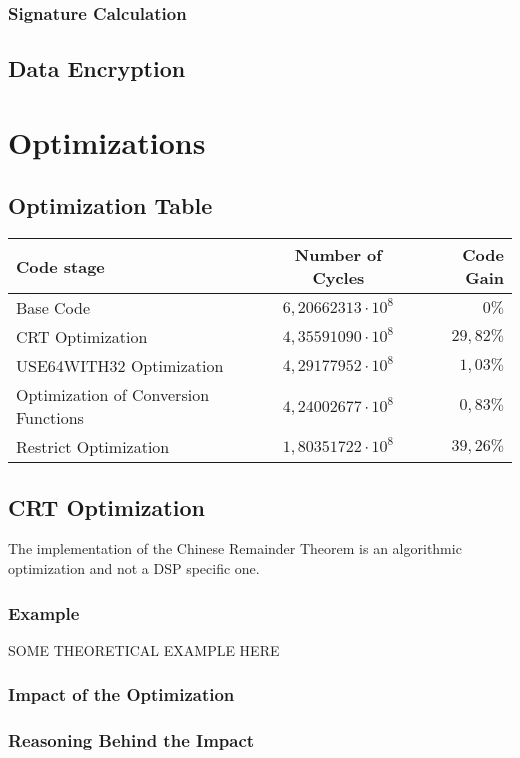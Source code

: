 \documentclass[a4paper]{article}
\begin{document}
\subsubsection{Signature Calculation}

\subsection{Data Encryption}

\section{Optimizations}
\subsection{Optimization Table}
\begin{center}
	\begin{tabular}{| l | c | r |}
		\hline
		Code stage 								& Number of Cycles 				& Code Gain \\ \hline
		Base Code 								& $6,20662313 \cdot 10^{8}$ 	& $0\%$ 	\\
		CRT Optimization 						& $4,35591090 \cdot 10^{8}$		& $29,82\%$ \\
		USE64WITH32 Optimization 				& $4,29177952 \cdot 10^{8}$		& $1,03\%$	\\
		Optimization of Conversion Functions	& $4,24002677 \cdot 10^{8}$		& $0,83\%$	\\
		Restrict Optimization					& $1,80351722 \cdot 10^{8}$		& $39,26\%$ \\
		\hline
	\end{tabular}
\end{center}
\subsection{CRT Optimization}
	The implementation of the Chinese Remainder Theorem is an algorithmic optimization and not a DSP specific one. 
	\subsubsection{Example}
		SOME THEORETICAL EXAMPLE HERE
	\subsubsection{Impact of the Optimization}
	\subsubsection{Reasoning Behind the Impact}
\end{document}
